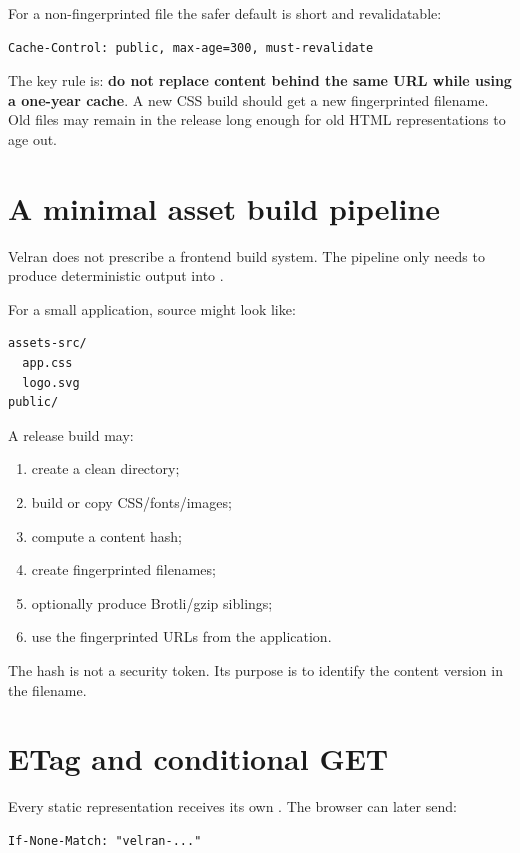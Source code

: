 For a non-fingerprinted file the safer default is short and revalidatable:

\begin{lstlisting}
Cache-Control: public, max-age=300, must-revalidate
\end{lstlisting}

The key rule is: \textbf{do not replace content behind the same URL while using a one-year cache}. A new CSS build should get a new fingerprinted filename. Old files may remain in the release long enough for old HTML representations to age out.

\section{A minimal asset build pipeline}

Velran does not prescribe a frontend build system. The pipeline only needs to produce deterministic output into .

For a small application, source might look like:

\begin{lstlisting}
assets-src/
  app.css
  logo.svg
public/
\end{lstlisting}

A release build may:

\begin{enumerate}
  \item create a clean  directory;
  \item build or copy CSS/fonts/images;
  \item compute a content hash;
  \item create fingerprinted filenames;
  \item optionally produce Brotli/gzip siblings;
  \item use the fingerprinted URLs from the application.
\end{enumerate}

The hash is not a security token. Its purpose is to identify the content version in the filename.

\section{ETag and conditional GET}

Every static representation receives its own . The browser can later send:

\begin{lstlisting}
If-None-Match: "velran-..."
\end{lstlisting}

